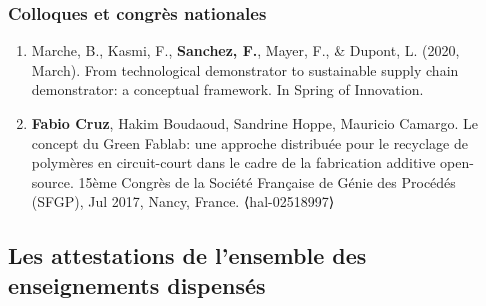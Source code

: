 \documentclass[
  11pt,
]{article}
\begin{document}
\hypertarget{colloques-et-congruxe8s-nationales}{%
\subsubsection{Colloques et congrès
nationales}\label{colloques-et-congruxe8s-nationales}}

\begin{enumerate}
\def\labelenumi{\arabic{enumi}.}
\item
  Marche, B., Kasmi, F., \textbf{Sanchez, F.}, Mayer, F., \& Dupont, L.
  (2020, March). From technological demonstrator to sustainable supply
  chain demonstrator: a conceptual framework. In Spring of Innovation.
\item
  \textbf{Fabio Cruz}, Hakim Boudaoud, Sandrine Hoppe, Mauricio Camargo.
  Le concept du Green Fablab: une approche distribuée pour le recyclage
  de polymères en circuit-court dans le cadre de la fabrication additive
  open-source. 15ème Congrès de la Société Française de Génie des
  Procédés (SFGP), Jul 2017, Nancy, France. ⟨hal-02518997⟩
\end{enumerate}

\newpage

\hypertarget{les-attestations-de-lensemble-des-enseignements-dispensuxe9s}{%
\subsection{Les attestations de l'ensemble des enseignements
dispensés}\label{les-attestations-de-lensemble-des-enseignements-dispensuxe9s}}


\end{document}
